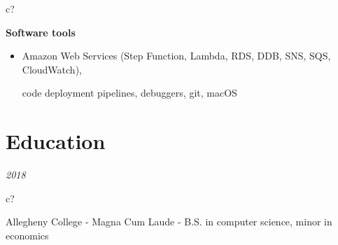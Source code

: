 \documentclass[12pt,a4paper,sans]{moderncv} %
\begin{document}

 \hspace{24.5 mm}
\begin{tabular}{c?}
 \\
\end{tabular}
 \hspace{2 mm}
 \textbf{Software tools}
 
\begin{itemize}
\addtolength{\itemindent}{31.7 mm}
\item{Amazon Web Services (Step Function, Lambda, RDS, DDB, SNS, SQS, CloudWatch), 

\hspace{30.5 mm} code deployment pipelines, debuggers, git, macOS}


 \hspace{30.5 mm}
\end{itemize}

\vspace{-8 mm}
\section{Education}
\hspace{11 mm}
\textit{2018}
\hspace{2 mm}
\begin{tabular}{c?}
 \\
\end{tabular}
 \hspace{2 mm}
Allegheny College - Magna Cum Laude - B.S. in computer science, minor in economics

 
\end{document}

